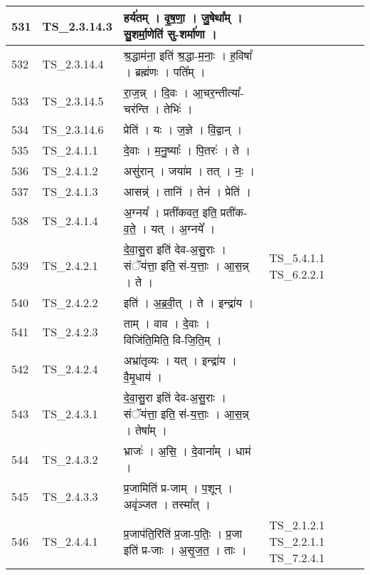 \documentclass[17pt]{extarticle}
\begin{document}
\begin{longtable}{||p{0.4in}||p{0.9in}||p{4.0in}||p{0.9in}||}
        \hline
            531 & TS\_2.3.14.3 & हर्य॑तम्   ।   वृ॒ष॒णा॒   ।   जु॒षेथा᳚म्   ।   सु॒शर्मा॒णेति॑ सु{-}शर्मा॑णा   ।    &      \\
        \hline
            532 & TS\_2.3.14.4 & श्र॒द्धाम॑ना॒ इति॑ श्र॒द्धा{-}म॒नाः॒   ।   ह॒विषा᳚   ।   ब्रह्म॑णः   ।   पति᳚म्   ।    &      \\
        \hline
            533 & TS\_2.3.14.5 & रा॒ज॒न्न्   ।   दि॒वः   ।   आ॒चर॒न्तीत्या᳚{-}चर॑न्ति   ।   तेभिः॑   ।    &      \\
        \hline
            534 & TS\_2.3.14.6 & प्रेति॑   ।   यः   ।   ज॒ज्ञे   ।   वि॒द्वान्   ।    &      \\
        \hline
            535 & TS\_2.4.1.1 & दे॒वाः   ।   म॒नु॒ष्याः᳚   ।   पि॒तरः॑   ।   ते   ।    &      \\
        \hline
            536 & TS\_2.4.1.2 & असु॑रान्   ।   जया॑म   ।   तत्   ।   नः॒   ।    &      \\
        \hline
            537 & TS\_2.4.1.3 & आसन्न्॑   ।   तानि॑   ।   तेन॑   ।   प्रेति॑   ।    &      \\
        \hline
            538 & TS\_2.4.1.4 & अ॒ग्नय᳚   ।   प्रती॑कवत॒ इति॒ प्रती॑क{-}व॒ते॒   ।   यत्   ।   अ॒ग्नये᳚   ।    &      \\
        \hline
            539 & TS\_2.4.2.1 & दे॒वा॒सु॒रा इति॑ देव{-}अ॒सु॒राः   ।   संॅय॑त्ता॒ इति॒ सं{-}य॒त्ताः॒   ।   आ॒स॒न्न्   ।   ते   ।    &  TS\_5.4.1.1 TS\_6.2.2.1       \\
        \hline
            540 & TS\_2.4.2.2 & इति॑   ।   अ॒ब्र॒वी॒त्   ।   ते   ।   इन्द्रा॑य   ।    &      \\
        \hline
            541 & TS\_2.4.2.3 & ताम्   ।   वाव   ।   दे॒वाः   ।   विजि॑ति॒मिति॒ वि{-}जि॒ति॒म्   ।    &      \\
        \hline
            542 & TS\_2.4.2.4 & अभ्रा॑तृव्यः   ।   यत्   ।   इन्द्रा॑य   ।   वै॒मृ॒धाय॑   ।    &      \\
        \hline
            543 & TS\_2.4.3.1 & दे॒वा॒सु॒रा इति॑ देव{-}अ॒सु॒राः   ।   संॅय॑त्ता॒ इति॒ सं{-}य॒त्ताः॒   ।   आ॒स॒न्न्   ।   तेषा᳚म्   ।    &      \\
        \hline
            544 & TS\_2.4.3.2 & भ्राजः॑   ।   अ॒सि॒   ।   दे॒वाना᳚म्   ।   धाम॑   ।    &      \\
        \hline
            545 & TS\_2.4.3.3 & प्र॒जामिति॑ प्र{-}जाम्   ।   प॒शून्   ।   अवृ॑ञ्जत   ।   तस्मा᳚त्   ।    &      \\
        \hline
            546 & TS\_2.4.4.1 & प्र॒जाप॑ति॒रिति॑ प्र॒जा{-}प॒तिः॒   ।   प्र॒जा इति॑ प्र{-}जाः   ।   अ॒सृ॒ज॒त॒   ।   ताः   ।    & TS\_2.1.2.1 TS\_2.2.1.1  TS\_7.2.4.1       \\

\end{longtable}
\end{document}
